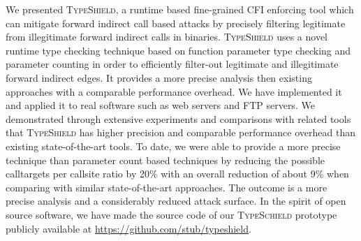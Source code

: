We presented \textsc{TypeShield}, a runtime based fine-grained CFI enforcing
tool which can mitigate forward indirect call based attacks by
precisely filtering legitimate from illegitimate forward indirect calls in binaries.
\textsc{TypeShield} uses a novel runtime type checking technique based on function parameter
type checking and parameter counting in order to efficiently filter-out legitimate
and illegitimate forward indirect edges.
It provides a more precise analysis then existing approaches with a
comparable performance overhead.
We have implemented it and applied it to real software such as web servers and FTP servers.
We demonstrated through extensive experiments and comparisons with related tools
that \textsc{TypeShield} has higher precision and comparable performance overhead than 
existing state-of-the-art tools. To date, we were able to provide a more precise
technique than parameter count based techniques by reducing the possible calltargets 
per callsite ratio by 20\% with an overall reduction of about 
9\% when comparing with similar state-of-the-art approaches.
The outcome is a more precise analysis and a considerably reduced attack surface.
In the spirit of open source software,
we have made the source code of our \textsc{TypeSchield} prototype
publicly available at \url{https://github.com/stub/typeshield}.


